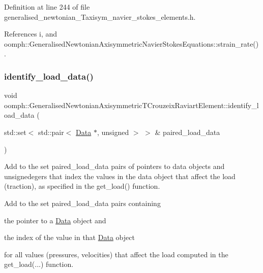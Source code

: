 Definition at line 244 of file generalised\+\_\+newtonian\+\_\+\+Taxisym\+\_\+navier\+\_\+stokes\+\_\+elements.\+h.



References i, and oomph\+::\+Generalised\+Newtonian\+Axisymmetric\+Navier\+Stokes\+Equations\+::strain\+\_\+rate().

\mbox{\label{classoomph_1_1GeneralisedNewtonianAxisymmetricTCrouzeixRaviartElement_aa8be933ba9c625f32b7b158ec91c7092}} 
\subsubsection{\texorpdfstring{identify\+\_\+load\+\_\+data()}{identify\_load\_data()}}
{\footnotesize\ttfamily void oomph\+::\+Generalised\+Newtonian\+Axisymmetric\+T\+Crouzeix\+Raviart\+Element\+::identify\+\_\+load\+\_\+data (\begin{DoxyParamCaption}\item[{std\+::set$<$ std\+::pair$<$ \hyperlink{classoomph_1_1Data}{Data} $\ast$, unsigned $>$ $>$ \&}]{paired\+\_\+load\+\_\+data }\end{DoxyParamCaption})}



Add to the set paired\+\_\+load\+\_\+data pairs of pointers to data objects and unsignedegers that index the values in the data object that affect the load (traction), as specified in the get\+\_\+load() function. 

Add to the set {\ttfamily paired\+\_\+load\+\_\+data} pairs containing
\begin{DoxyItemize}
\item the pointer to a \hyperlink{classoomph_1_1Data}{Data} object and
\item the index of the value in that \hyperlink{classoomph_1_1Data}{Data} object
\end{DoxyItemize}for all values (pressures, velocities) that affect the load computed in the {\ttfamily get\+\_\+load}(...) function. 

